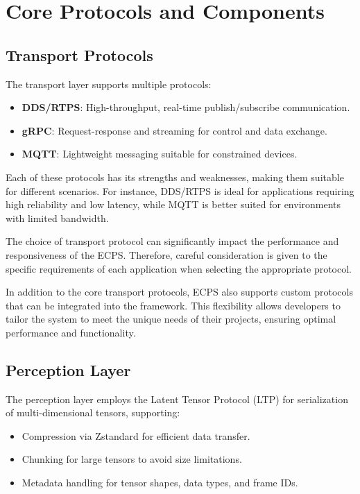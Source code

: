 \documentclass[12pt]{article}
\begin{document}
\section{Core Protocols and Components}
\subsection{Transport Protocols}
The transport layer supports multiple protocols:
\begin{itemize}
  \item \textbf{DDS/RTPS}: High-throughput, real-time publish/subscribe communication.
  \item \textbf{gRPC}: Request-response and streaming for control and data exchange.
  \item \textbf{MQTT}: Lightweight messaging suitable for constrained devices.
\end{itemize}

Each of these protocols has its strengths and weaknesses, making them suitable for different scenarios. For instance, DDS/RTPS is ideal for applications requiring high reliability and low latency, while MQTT is better suited for environments with limited bandwidth.

The choice of transport protocol can significantly impact the performance and responsiveness of the ECPS. Therefore, careful consideration is given to the specific requirements of each application when selecting the appropriate protocol.

In addition to the core transport protocols, ECPS also supports custom protocols that can be integrated into the framework. This flexibility allows developers to tailor the system to meet the unique needs of their projects, ensuring optimal performance and functionality.

\subsection{Perception Layer}
The perception layer employs the Latent Tensor Protocol (LTP) for serialization of multi-dimensional tensors, supporting:
\begin{itemize}
  \item Compression via Zstandard for efficient data transfer.
  \item Chunking for large tensors to avoid size limitations.
  \item Metadata handling for tensor shapes, data types, and frame IDs.
\end{itemize}
\end{document}
